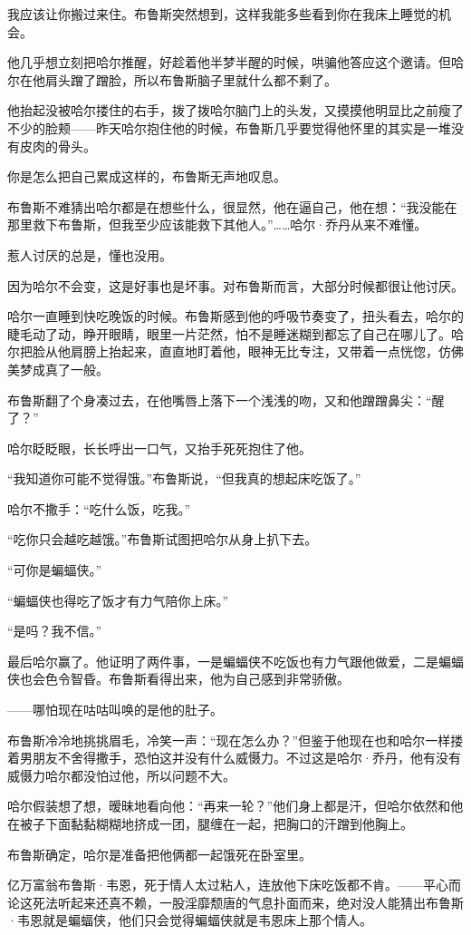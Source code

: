 \documentclass[../main]{subfiles}
\begin{document}
我应该让你搬过来住。布鲁斯突然想到，这样我能多些看到你在我床上睡觉的机会。

他几乎想立刻把哈尔推醒，好趁着他半梦半醒的时候，哄骗他答应这个邀请。但哈尔在他肩头蹭了蹭脸，所以布鲁斯脑子里就什么都不剩了。

他抬起没被哈尔搂住的右手，拨了拨哈尔脑门上的头发，又摸摸他明显比之前瘦了不少的脸颊——昨天哈尔抱住他的时候，布鲁斯几乎要觉得他怀里的其实是一堆没有皮肉的骨头。

你是怎么把自己累成这样的，布鲁斯无声地叹息。

布鲁斯不难猜出哈尔都是在想些什么，很显然，他在逼自己，他在想：“我没能在那里救下布鲁斯，但我至少应该能救下其他人。”……哈尔·乔丹从来不难懂。

惹人讨厌的总是，懂也没用。

因为哈尔不会变，这是好事也是坏事。对布鲁斯而言，大部分时候都很让他讨厌。

哈尔一直睡到快吃晚饭的时候。布鲁斯感到他的呼吸节奏变了，扭头看去，哈尔的睫毛动了动，睁开眼睛，眼里一片茫然，怕不是睡迷糊到都忘了自己在哪儿了。哈尔把脸从他肩膀上抬起来，直直地盯着他，眼神无比专注，又带着一点恍惚，仿佛美梦成真了一般。

布鲁斯翻了个身凑过去，在他嘴唇上落下一个浅浅的吻，又和他蹭蹭鼻尖：“醒了？”

哈尔眨眨眼，长长呼出一口气，又抬手死死抱住了他。

“我知道你可能不觉得饿。”布鲁斯说，“但我真的想起床吃饭了。”

哈尔不撒手：“吃什么饭，吃我。”

“吃你只会越吃越饿。”布鲁斯试图把哈尔从身上扒下去。

“可你是蝙蝠侠。”

“蝙蝠侠也得吃了饭才有力气陪你上床。”

“是吗？我不信。”

最后哈尔赢了。他证明了两件事，一是蝙蝠侠不吃饭也有力气跟他做爱，二是蝙蝠侠也会色令智昏。布鲁斯看得出来，他为自己感到非常骄傲。

——哪怕现在咕咕叫唤的是他的肚子。

布鲁斯冷冷地挑挑眉毛，冷笑一声：“现在怎么办？”但鉴于他现在也和哈尔一样搂着男朋友不舍得撒手，恐怕这并没有什么威慑力。不过这是哈尔·乔丹，他有没有威慑力哈尔都没怕过他，所以问题不大。

哈尔假装想了想，暧昧地看向他：“再来一轮？”他们身上都是汗，但哈尔依然和他在被子下面黏黏糊糊地挤成一团，腿缠在一起，把胸口的汗蹭到他胸上。

布鲁斯确定，哈尔是准备把他俩都一起饿死在卧室里。

亿万富翁布鲁斯·韦恩，死于情人太过粘人，连放他下床吃饭都不肯。——平心而论这死法听起来还真不赖，一股淫靡颓唐的气息扑面而来，绝对没人能猜出布鲁斯·韦恩就是蝙蝠侠，他们只会觉得蝙蝠侠就是韦恩床上那个情人。
\end{document}
